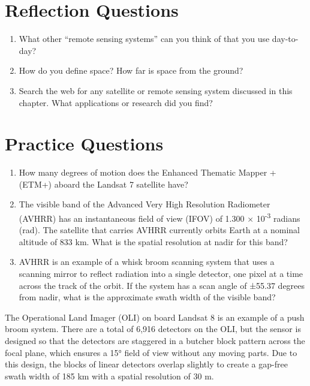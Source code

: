 \documentclass[
]{book}
\providecommand{\tightlist}{%
  \setlength{\itemsep}{0pt}\setlength{\parskip}{0pt}}
\begin{document}
\section*{Reflection Questions}\label{reflection-questions-7}

\begin{enumerate}
\def\labelenumi{\arabic{enumi}.}
\tightlist
\item
  What other ``remote sensing systems'' can you think of that you use day-to-day?
\item
  How do you define space? How far is space from the ground?
\item
  Search the web for any satellite or remote sensing system discussed in this chapter. What applications or research did you find?
\end{enumerate}

\section*{Practice Questions}\label{practice-questions-3}

\begin{enumerate}
\def\labelenumi{\arabic{enumi}.}
\tightlist
\item
  How many degrees of motion does the Enhanced Thematic Mapper + (ETM+) aboard the Landsat 7 satellite have?
\item
  The visible band of the Advanced Very High Resolution Radiometer (AVHRR) has an instantaneous field of view (IFOV) of 1.300 × 10\textsuperscript{-3} radians (rad). The satellite that carries AVHRR currently orbits Earth at a nominal altitude of 833 km. What is the spatial resolution at nadir for this band?
\item
  AVHRR is an example of a whisk broom scanning system that uses a scanning mirror to reflect radiation into a single detector, one pixel at a time across the track of the orbit. If the system has a scan angle of ±55.37 degrees from nadir, what is the approximate swath width of the visible band?
\end{enumerate}

The Operational Land Imager (OLI) on board Landsat 8 is an example of a push broom system. There are a total of 6,916 detectors on the OLI, but the sensor is designed so that the detectors are staggered in a butcher block pattern across the focal plane, which ensures a 15° field of view without any moving parts. Due to this design, the blocks of linear detectors overlap slightly to create a gap-free swath width of 185 km with a spatial resolution of 30 m.
\end{document}
